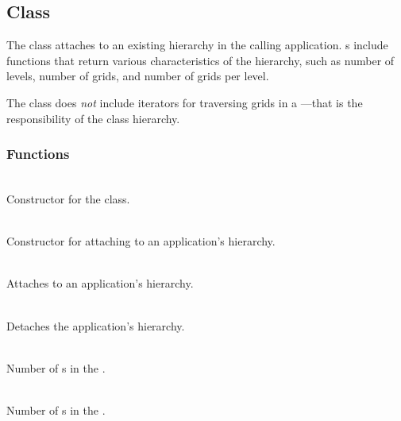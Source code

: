 \documentclass[11pt]{article}
\begin{document}
\subsection{ Class} \label{ss:hierarchy}

   The  class attaches to an existing hierarchy in
   the calling application.  s include functions that
   return various characteristics of the hierarchy, such as number of
   levels, number of grids, and number of grids per level.

   The  class does \textit{not} include iterators for
   traversing grids in a ---that is the responsibility
   of the  class hierarchy.

   \umlHierarchy

\subsubsection{ Functions}

     \\
    Constructor for the  class.

     \\
    Constructor for attaching to an application's hierarchy.

     \\
    Attaches to an application's hierarchy.

     \\
    Detaches the application's hierarchy.

     \\
    Number of s in the .

     \\
    Number of s in the .
\end{document}
